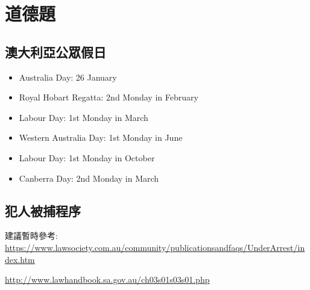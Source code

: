\section{道德題}
\subsection{澳大利亞公眾假日}
\begin{itemize}
  \itemsep0em
  \item Australia Day: 26 January
  \item Royal Hobart Regatta: 2nd Monday in February
  \item Labour Day: 1st Monday in March
  \item Western Australia Day: 1st Monday in June
  \item Labour Day: 1st Monday in October
  \item Canberra Day: 2nd Monday in March
\end{itemize}

\subsection{犯人被捕程序}
建議暫時參考: \url{https://www.lawsociety.com.au/community/publicationsandfaqs/UnderArrest/index.htm}

\url{http://www.lawhandbook.sa.gov.au/ch03s01s03s01.php}